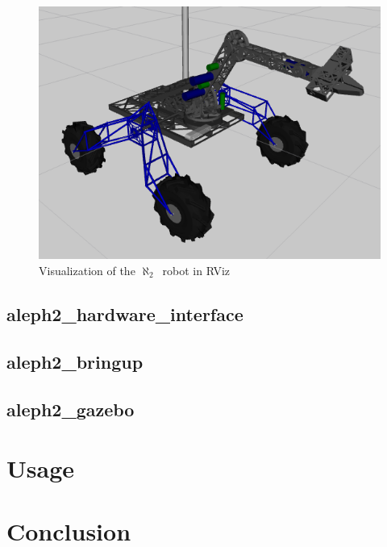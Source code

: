 \documentclass[english,inz,shortabstract]{iithesis}
\newcommand{\rovername}{$\aleph_2$\ }
\begin{document}
        \begin{figure}[ht]
            \centering
            \captionsetup{margin=2cm}
            \includegraphics[width=\textwidth]{img/description_rviz.png}
            \caption{Visualization of the \rovername robot in RViz}
            \label{fig:description_rviz}
        \end{figure}

\section{aleph2\_hardware\_interface}

\section{aleph2\_bringup}

\section{aleph2\_gazebo}

\chapter{Usage}

\chapter{Conclusion}



\end{document}
